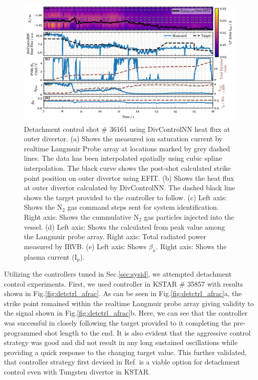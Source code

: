 \begin{figure}[!ht]
 \centering
 \includegraphics[width=\textwidth]{figures/DetCtrl_2D_36161.pdf}
 \caption{
Detachment control shot \# 36161 using DivControlNN heat flux at outer divertor.
(a) Shows the measured ion saturation current by realtime Langmuir Probe array at locations marked by grey dashed lines.
The data has been interpolated spatially using cubic spline interpolation.
The black curve shows the post-shot calculated strike point position on outer divertor using EFIT.
(b) Shows the heat flux at outer divertor calculated by DivControlNN.
The dashed black line shows the target provided to the controller to follow.
(c) Left axis: Shows the N$_2$ gas command steps sent for system identification.
Right axis: Shows the cummulative N$_2$ gas particles injected into the vessel.
(d) Left axis: Shows the \Afrac calculated from peak value among the Langmuir probe array.
Right axis: Total radiated power measured by \ac{IRVB}.
(e) Left axis: Shows $\beta_n$.
Right axis: Shows the plasma current (I$_p$).
}
 \label{fig:detctrl_sm}
\end{figure}

Utilizing the controllers tuned in Sec.\ref{sec:sysid}, we attempted detachment control experiments.
First, we used \Afrac controller in KSTAR \# 35857 with results shown in Fig.\ref{fig:detctrl_afrac}.
As can be seen in Fig.\ref{fig:detctrl_afrac}a, the strike point remained within the realtime Langmuir probe array giving validity to the \Afrac signal shown in Fig.\ref{fig:detctrl_afrac}b.
Here, we can see that the controller was successful in closely following the target provided to it completing the pre-programmed shot length to the end.
It is also evident that the aggressive control strategy was good and did not result in any long sustained oscillations while providing a quick response to the changing target value.
This further validated, that \Afrac controller strategy first devised in Ref.\cite{Eldon_2022_PPCF} is a viable option for detachment control even with Tungsten divertor in KSTAR.

